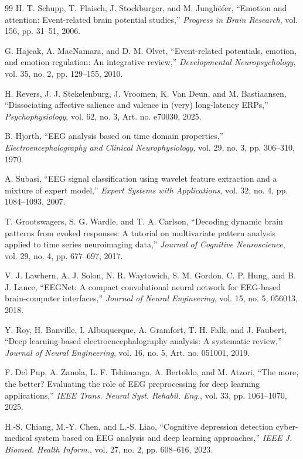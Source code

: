 \documentclass[journal]{IEEEtran}
\begin{document}
\begin{thebibliography}{99}
H. T. Schupp, T. Flaisch, J. Stockburger, and M. Jungh\"ofer, ``Emotion and attention: Event-related brain potential studies,'' \emph{Progress in Brain Research}, vol. 156, pp. 31--51, 2006.

G. Hajcak, A. MacNamara, and D. M. Olvet, ``Event-related potentials, emotion, and emotion regulation: An integrative review,'' \emph{Developmental Neuropsychology}, vol. 35, no. 2, pp. 129--155, 2010.

H. Revers, J. J. Stekelenburg, J. Vroomen, K. Van Deun, and M. Bastiaansen, ``Dissociating affective salience and valence in (very) long-latency ERPs,'' \emph{Psychophysiology}, vol. 62, no. 3, Art. no. e70030, 2025.

B. Hjorth, ``EEG analysis based on time domain properties,'' \emph{Electroencephalography and Clinical Neurophysiology}, vol. 29, no. 3, pp. 306--310, 1970.

A. Subasi, ``EEG signal classification using wavelet feature extraction and a mixture of expert model,'' \emph{Expert Systems with Applications}, vol. 32, no. 4, pp. 1084--1093, 2007.

T. Grootswagers, S. G. Wardle, and T. A. Carlson, ``Decoding dynamic brain patterns from evoked responses: A tutorial on multivariate pattern analysis applied to time series neuroimaging data,'' \emph{Journal of Cognitive Neuroscience}, vol. 29, no. 4, pp. 677--697, 2017.

V. J. Lawhern, A. J. Solon, N. R. Waytowich, S. M. Gordon, C. P. Hung, and B. J. Lance, ``EEGNet: A compact convolutional neural network for EEG-based brain-computer interfaces,'' \emph{Journal of Neural Engineering}, vol. 15, no. 5, 056013, 2018.

Y. Roy, H. Banville, I. Albuquerque, A. Gramfort, T. H. Falk, and J. Faubert, ``Deep learning-based electroencephalography analysis: A systematic review,'' \emph{Journal of Neural Engineering}, vol. 16, no. 5, Art. no. 051001, 2019.

F. Del Pup, A. Zanola, L. F. Tshimanga, A. Bertoldo, and M. Atzori, ``The more, the better? Evaluating the role of EEG preprocessing for deep learning applications,'' \emph{IEEE Trans. Neural Syst. Rehabil. Eng.}, vol. 33, pp. 1061--1070, 2025.

H.-S. Chiang, M.-Y. Chen, and L.-S. Liao, ``Cognitive depression detection cyber-medical system based on EEG analysis and deep learning approaches,'' \emph{IEEE J. Biomed. Health Inform.}, vol. 27, no. 2, pp. 608--616, 2023.


\end{thebibliography}
\end{document}
